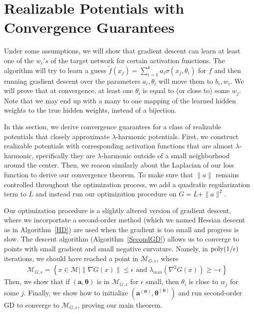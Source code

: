 
\section{Realizable Potentials with Convergence Guarantees}
\label{sec:almost-harmonic}
{\color{red} 
Under some assumptions, we
will show that gradient descent can learn at least one of the $w_i's$
of the target network for certain activation functions. The algorithm
will try to learn a guess
$\widetilde{f}(x_j) = \sum_{i=1}^k a_i \sigma(x_j,\theta_i)$ for $f$
and then running gradient descent over the parameters $a_i, \theta_i$
will move them to $b_i, w_i$. We will prove that at convergence, at
least one $\theta_i$ is equal to (or close to) some $w_j$. Note that
we may end up with a many to one mapping of the learned hidden weights
to the true hidden weights, instead of a bijection.


}
%
In this section, we derive convergence guarantees for a class of realizable potentials that closely approximate $\lambda$-harmonic potentials. First, we construct realizable potentials with corresponding activation functions that are almost $\lambda$-harmonic, specifically they are $\lambda$-harmonic outside of a small neighborhood around the center. Then, we reason similarly about the Laplacian of our loss function to derive our convergence theorem. To make sure that $\|a\|$ remains controlled throughout the optimization process, we add a quadratic regularization term to $L$ and instead run our optimization procedure on $G = L + \|a\|^2$.

Our optimization procedure is a slightly altered version of gradient descent, where we incorportate a second-order method (which we named Hessian descent as in Algorithm~\ref{HD}) are used when the gradient is too small and progress is slow. The descent algorithm (Algorithm~\ref{SecondGD}) allows us to converge to points with small gradient and small negative curvature. Namely, in $\mathrm{poly}(1/\epsilon)$ iterations, we should have reached a point in $\mathcal{M}_{G, \epsilon}$, where 
%
%
\begin{align*}
\mathcal{M}_{G, \epsilon} = \left\{x\in \mathcal{M} \Big| \|\nabla G(x)\|
  \leq \epsilon \text{ and } \lambda_{min}(\nabla^2 G(x)) \geq
  -\epsilon\right\}
  \end{align*}
Then, we show that if $(\boldsymbol{a,\theta})$ is in $\mathcal{M}_{G, \epsilon}$ for $\epsilon$ small, then $\theta_i$ is close to $w_j$ for some $j$. Finally, we show how to initialize $(\boldsymbol{a^{(0)},\theta^{(0)}})$ and run second-order GD to converge to $\mathcal{M}_{G,\epsilon}$, proving our main theorem.

